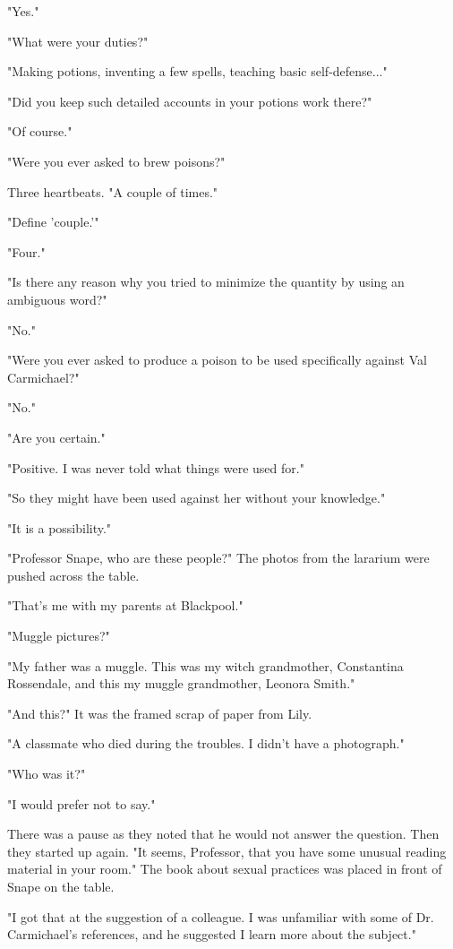 \documentclass[a4paper,11pt]{article}
\begin{document}
"Yes."

"What were your duties?"

"Making potions, inventing a few spells, teaching basic self-defense..."

"Did you keep such detailed accounts in your potions work there?"

"Of course."

"Were you ever asked to brew poisons?"

Three heartbeats. "A couple of times."

"Define 'couple.'"

"Four."

"Is there any reason why you tried to minimize the quantity by using an ambiguous word?"

"No."

"Were you ever asked to produce a poison to be used specifically against Val Carmichael?"

"No."

"Are you certain."

"Positive. I was never told what things were used for."

"So they might have been used against her without your knowledge."

"It is a possibility."

"Professor Snape, who are these people?" The photos from the lararium were pushed across the table.

"That's me with my parents at Blackpool."

"Muggle pictures?"

"My father was a muggle. This was my witch grandmother, Constantina Rossendale, and this my muggle grandmother, Leonora Smith."

"And this?" It was the framed scrap of paper from Lily.

"A classmate who died during the troubles. I didn't have a photograph."

"Who was it?"

"I would prefer not to say."

There was a pause as they noted that he would not answer the question. Then they started up again. "It seems, Professor, that you have some unusual reading material in your room." The book about sexual practices was placed in front of Snape on the table.

"I got that at the suggestion of a colleague. I was unfamiliar with some of Dr. Carmichael's references, and he suggested I learn more about the subject."
\end{document}
